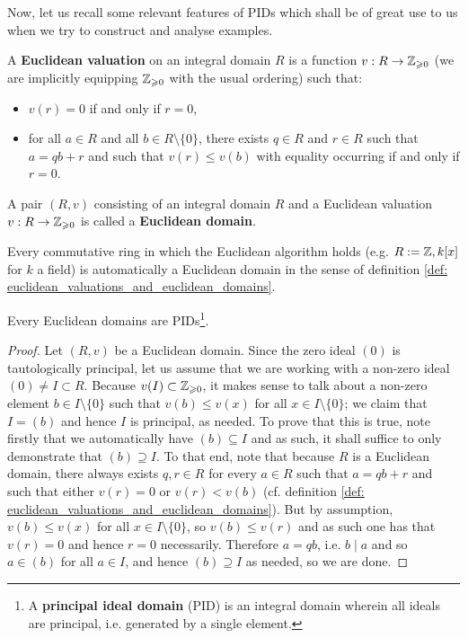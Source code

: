         Now, let us recall some relevant features of PIDs which shall be of great use to us when we try to construct and analyse examples.
        \begin{definition} \label{def: euclidean_valuations_and_euclidean_domains}
            \cite[Definition V.2.7]{aluffi_chapter_0} A \textbf{Euclidean valuation} on an integral domain $R$ is a function $v: R \to \mathbb{Z}_{\geqslant 0}$ (we are implicitly equipping $\mathbb{Z}_{\geqslant 0}$ with the usual ordering) such that:
                \begin{itemize}
                    \item $v(r) = 0$ if and only if $r = 0$,
                    \item for all $a \in R$ and all $b \in R \setminus \{0\}$, there exists $q\in R$ and $r \in R$ such that $a = qb + r$ and such that $v(r) \leq v(b)$ with equality occurring if and only if $r = 0$.
                \end{itemize}
            A pair $(R, v)$ consisting of an integral domain $R$ and a Euclidean valuation $v: R \to \mathbb{Z}_{\geqslant 0}$ is called a \textbf{Euclidean domain}.
        \end{definition}
        \begin{example}
            Every commutative ring in which the Euclidean algorithm holds (e.g. $R := \mathbb{Z}, k[x]$ for $k$ a field) is automatically a Euclidean domain in the sense of definition \ref{def: euclidean_valuations_and_euclidean_domains}.
        \end{example}
        \begin{lemma} \label{lemma: euclidean_domain_are_PIDs}
            \cite[Proposition V.2.8]{aluffi_chapter_0} Every Euclidean domains are PIDs\footnote{A \textbf{principal ideal domain} (PID) is an integral domain wherein all ideals are principal, i.e. generated by a single element.}.
        \end{lemma}
            \begin{proof}
                Let $(R, v)$ be a Euclidean domain. Since the zero ideal $(0)$ is tautologically principal, let us assume that we are working with a non-zero ideal $(0) \not = I \subset R$. Because $v(I) \subset \mathbb{Z}_{\geqslant 0}$, it makes sense to talk about a non-zero element $b \in I \setminus \{0\}$ such that $v(b) \leq v(x)$ for all $x \in I \setminus \{0\}$; we claim that $I = (b)$ and hence $I$ is principal, as needed. To prove that this is true, note firstly that we automatically have $(b) \subseteq I$ and as such, it shall suffice to only demonstrate that $(b) \supseteq I$. To that end, note that because $R$ is a Euclidean domain, there always exists $q, r \in R$ for every $a \in R$ such that $a = qb + r$ and such that either $v(r) = 0$ or $v(r) < v(b)$ (cf. definition \ref{def: euclidean_valuations_and_euclidean_domains}). But by assumption, $v(b) \leq v(x)$ for all $x \in I \setminus \{0\}$, so $v(b) \leq v(r)$ and as such one has that $v(r) = 0$ and hence $r = 0$ necessarily. Therefore $a = qb$, i.e. $b \mid a$ and so $a \in (b)$ for all $a \in I$, and hence $(b) \supseteq I$ as needed, so we are done.  
            \end{proof}
